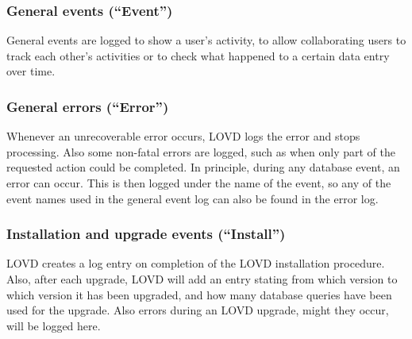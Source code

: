\documentclass[a4paper,oneside,openany,12pt]{memoir}
\begin{document}

\subsubsection{General events (``Event'')}
General events are logged to show a user's activity, to allow collaborating users to track each other's
 activities or to check what happened to a certain data entry over time.


\subsubsection{General errors (``Error'')}
Whenever an unrecoverable error occurs, LOVD logs the error and stops processing.
Also some non-fatal errors are logged, such as when only part of the requested action could be completed.
In principle, during any database event, an error can occur.
This is then logged under the name of the event, so any of the event names used in the general event log can also be found in the error log.

\subsubsection{Installation and upgrade events (``Install'')}
LOVD creates a log entry on completion of the LOVD installation procedure.
Also, after each upgrade, LOVD will add an entry stating from which version to which version it has been upgraded,
 and how many database queries have been used for the upgrade.
Also errors during an LOVD upgrade, might they occur, will be logged here.
\end{document}
